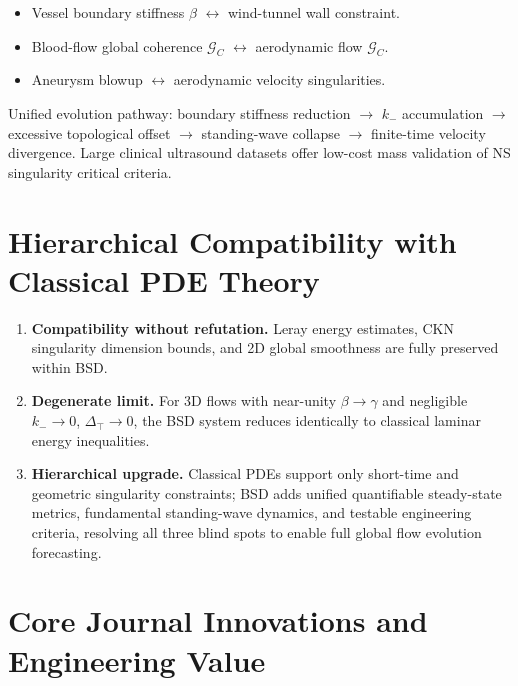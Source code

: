 \documentclass[11pt,a4paper]{article}
\theoremstyle{remark}
\newcommand{\kminus}{k_{-}}
\newcommand{\GC}{\mathcal{G}_{\!C}}
\newcommand{\Dtop}{\Delta_{\!\top}}
\begin{document}
\begin{itemize}
    \item Vessel boundary stiffness $\beta$ $\leftrightarrow$ wind-tunnel wall constraint.
    \item Blood-flow global coherence $\GC$ $\leftrightarrow$ aerodynamic flow $\GC$.
    \item Aneurysm blowup $\leftrightarrow$ aerodynamic velocity singularities.
\end{itemize}

Unified evolution pathway: boundary stiffness reduction $\to$ $\kminus$ accumulation $\to$ excessive topological offset $\to$ standing-wave collapse $\to$ finite-time velocity divergence. Large clinical ultrasound datasets offer low-cost mass validation of NS singularity critical criteria.

\section{Hierarchical Compatibility with Classical PDE Theory}\label{sec:compat}

\begin{enumerate}
    \item \textbf{Compatibility without refutation.} Leray energy estimates, CKN singularity dimension bounds, and 2D global smoothness are fully preserved within BSD.
    \item \textbf{Degenerate limit.} For 3D flows with near-unity $\beta\to\gamma$ and negligible $\kminus\to 0$, $\Dtop\to 0$, the BSD system reduces identically to classical laminar energy inequalities.
    \item \textbf{Hierarchical upgrade.} Classical PDEs support only short-time and geometric singularity constraints; BSD adds unified quantifiable steady-state metrics, fundamental standing-wave dynamics, and testable engineering criteria, resolving all three blind spots to enable full global flow evolution forecasting.
\end{enumerate}

\section{Core Journal Innovations and Engineering Value}\label{sec:innovation}
\end{document}
